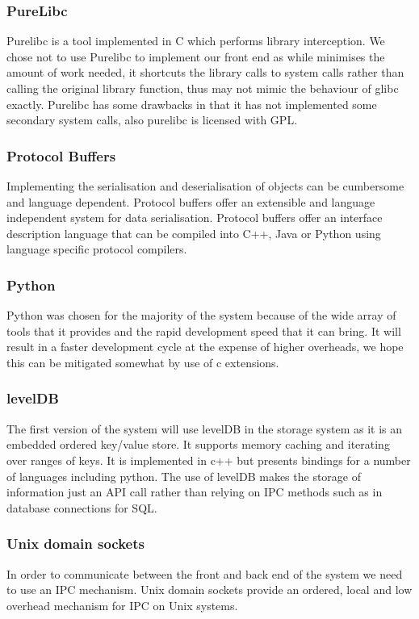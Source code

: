 
\subsubsection{PureLibc}
\label{PurelibcJust}
Purelibc is a tool implemented in C which performs library interception. We chose not to use Purelibc to implement our front end as while minimises the amount of work needed, it shortcuts the library calls to system calls rather than calling the original library function, thus may not mimic the behaviour of glibc exactly. Purelibc has some drawbacks in that  it has not implemented some secondary system calls, also purelibc is licensed with GPL.

\subsubsection{Protocol Buffers}
\label{ProbufJust}
Implementing the serialisation and deserialisation of objects can be cumbersome and language dependent. Protocol buffers offer an extensible and language independent system for data serialisation. Protocol buffers offer an interface description language that can be compiled into C++, Java or Python using language specific protocol compilers.

\subsubsection{Python}
Python was chosen for the majority of the system because of the wide array of tools that it provides and the rapid development speed that it can bring. It will result in a faster development cycle at the expense of higher overheads, we hope this can be mitigated somewhat by use of c extensions.
\subsubsection{levelDB}
\label{levelDBJust}
The first version of the system will use levelDB in the storage system as it is an embedded ordered key/value store. It supports memory caching and iterating over ranges of keys. It is implemented in c++ but presents bindings for a number of languages including python. The use of levelDB makes the storage of information just an API call rather than relying on IPC methods such as in database connections for SQL.
\subsubsection{Unix domain sockets}
In order to communicate between the front and back end of the system we need to use an IPC mechanism. Unix domain sockets provide an ordered, local and low overhead mechanism for IPC on Unix systems. 
